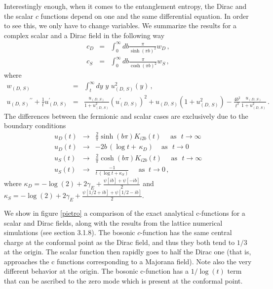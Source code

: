 \documentclass[a4paper]{article}
\begin{document}
Interestingly enough, when it comes to the entanglement entropy, the Dirac and the scalar $c$ functions depend on one and the same differential equation. In order to see this, we only have to change variables. We summarize the results for a complex scalar and a Dirac field in the following way 
\begin{eqnarray}
c_D&=&\int_0^{\infty}db \frac{\pi}{\sinh(\pi b)^2}w_{D}\,,\\
c_S&=&\int_0^{\infty}db \frac{\pi}{\cosh(\pi b)^2}w_{S}\,,
\end{eqnarray}
where
\begin{eqnarray}
w_{(D,\,S)}&=&\int_{t}^{\infty}dy\,\,y\,\,u_{(D,\,S)}^{2}(y)  \,,\\
u_{(D,\,S)}{^{\prime \prime }}+\frac{1}{t}u_{(D,\,S)}^{\prime} &=&\frac{
u_{(D,\,S)}}{1+u_{(D,\,S)}^{2}}\left( u_{(D,\,S)}^{\prime}\right)
^{2}+u_{(D,\,S)}\left( 1+u_{(D,\,S)}^{2}\right) -\frac{4b^{2}}{t^{2}}\frac{u_{(D,\,S)}}{1+u_{(D,\,S)}^{2}}\,. 
\end{eqnarray}
The differences between the fermionic and scalar cases are exclusively due to the boundary conditions 
\begin{eqnarray}
u_D(t) &\rightarrow &\frac{2}{\pi} \sinh (b \pi) K_{i 2 b} (t)\,\,\,\,\,\,\,\, \textrm{as} \,\,\,\, t\rightarrow \infty \,\\
u_{D}(t)&\rightarrow& -2 b \,(\log t+\,\kappa_{D})\,\,\,\,\,\,\,\textrm{as}\,\,\,\,t\rightarrow 0 \\
u_{S}(t)&\rightarrow &\frac{2}{\pi} \cosh (b \pi) K_{i 2 b} (t)\,\,\,\,\,\,\,\, \textrm{as} \,\,\,\, t\rightarrow \infty \\
u_{S}(t) &\rightarrow & \frac{-1}{t \,(\log t+\kappa_S)}\;\;\;\;\;\textrm{as}\;\;t\to 0\,,
\end{eqnarray}
where $\kappa_D=-\log(2)+2\gamma_E+\frac{\psi[ib]+\psi[-ib]}{2}$ and $\kappa_S=-\log(2)+2\gamma_E+\frac{\psi[1/2+ib]+\psi[1/2-ib]}{2}$.

We show in figure \ref{pietro} a comparison of the exact analytical c-functions for a scalar and Dirac fields, along with the results from the lattice numerical simulations (see section 3.1.8). The bosonic $c$-function has the same central charge at the conformal point as the Dirac field, and thus they both tend to $1/3$ at the origin. The scalar function then rapidly goes to half the Dirac one (that is, approaches the c functions corresponding to a Majorana field). Note also the very different behavior at the origin. The bosonic c-function has a $1/\log (t)$ term that can be ascribed to the zero mode which is present at the conformal point.
\end{document}
